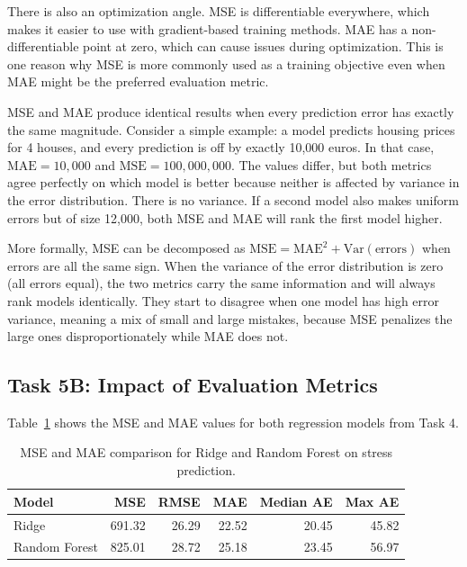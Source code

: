\documentclass[runningheads]{llncs}
\begin{document}
There is also an optimization angle. MSE is differentiable everywhere, which makes it easier to use with gradient-based training methods. MAE has a non-differentiable point at zero, which can cause issues during optimization. This is one reason why MSE is more commonly used as a training objective even when MAE might be the preferred evaluation metric.

MSE and MAE produce identical results when every prediction error has exactly the same magnitude. Consider a simple example: a model predicts housing prices for 4 houses, and every prediction is off by exactly 10{,}000 euros. In that case, $\text{MAE} = 10{,}000$ and $\text{MSE} = 100{,}000{,}000$. The values differ, but both metrics agree perfectly on which model is better because neither is affected by variance in the error distribution. There is no variance. If a second model also makes uniform errors but of size 12{,}000, both MSE and MAE will rank the first model higher.

More formally, MSE can be decomposed as $\text{MSE} = \text{MAE}^2 + \text{Var}(\text{errors})$ when errors are all the same sign. When the variance of the error distribution is zero (all errors equal), the two metrics carry the same information and will always rank models identically. They start to disagree when one model has high error variance, meaning a mix of small and large mistakes, because MSE penalizes the large ones disproportionately while MAE does not.

\subsection*{Task 5B: Impact of Evaluation Metrics}

Table~\ref{tab:task5_metrics} shows the MSE and MAE values for both regression models from Task 4.

\begin{table}[h]
\caption{MSE and MAE comparison for Ridge and Random Forest on stress prediction.}
\label{tab:task5_metrics}
\centering
\begin{tabular}{|l|r|r|r|r|r|}
\hline
Model & MSE & RMSE & MAE & Median AE & Max AE \\
\hline
Ridge & 691.32 & 26.29 & 22.52 & 20.45 & 45.82 \\
Random Forest & 825.01 & 28.72 & 25.18 & 23.45 & 56.97 \\
\hline
\end{tabular}
\end{table}
\end{document}
